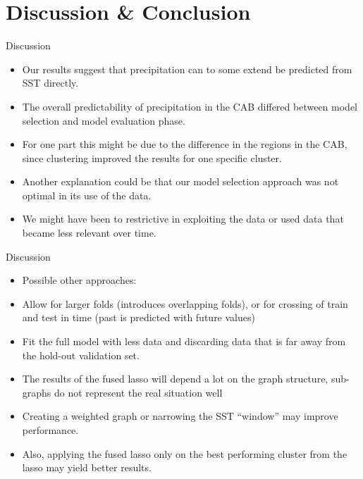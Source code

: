 \documentclass[
  ignorenonframetext,
]{beamer}
\providecommand{\tightlist}{%
  \setlength{\itemsep}{0pt}\setlength{\parskip}{0pt}}
\begin{document}
\hypertarget{discussion-conclusion}{%
\section{Discussion \& Conclusion}\label{discussion-conclusion}}

\begin{frame}{Discussion}
\protect\hypertarget{discussion}{}
\begin{itemize}
\tightlist
\item
  Our results suggest that precipitation can to some extend be predicted
  from SST directly.
\item
  The overall predictability of precipitation in the CAB differed
  between model selection and model evaluation phase.
\item
  For one part this might be due to the difference in the regions in the
  CAB, since clustering improved the results for one specific cluster.
\item
  Another explanation could be that our model selection approach was not
  optimal in its use of the data.
\item
  We might have been to restrictive in exploiting the data or used data
  that became less relevant over time.
\end{itemize}
\end{frame}

\begin{frame}{Discussion}
\protect\hypertarget{discussion-1}{}
\begin{itemize}
\tightlist
\item
  Possible other approaches:
\item
  Allow for larger folds (introduces overlapping folds), or for crossing
  of train and test in time (past is predicted with future values)
\item
  Fit the full model with less data and discarding data that is far away
  from the hold-out validation set.
\item
  The results of the fused lasso will depend a lot on the graph
  structure, sub-graphs do not represent the real situation well
\item
  Creating a weighted graph or narrowing the SST ``window'' may improve
  performance.
\item
  Also, applying the fused lasso only on the best performing cluster
  from the lasso may yield better results.
\end{itemize}
\end{frame}
\end{document}
